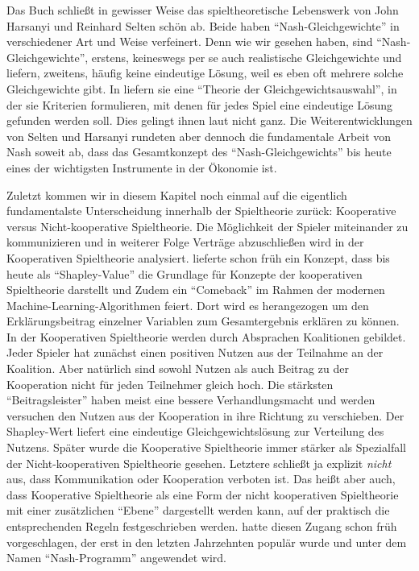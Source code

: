 Das Buch \textcite{Harsanyi1988} schließt in gewisser Weise das spieltheoretische Lebenswerk von John Harsanyi und Reinhard Selten schön ab. Beide haben "`Nash-Gleichgewichte"' in verschiedener Art und Weise verfeinert. Denn wie wir gesehen haben, sind "`Nash-Gleichgewichte"', erstens, keineswegs per se auch realistische Gleichgewichte und liefern, zweitens, häufig keine eindeutige Lösung, weil es eben oft mehrere solche Gleichgewichte gibt. In \textcite{Harsanyi1988} liefern sie eine "`Theorie der Gleichgewichtsauswahl"', in der sie Kriterien formulieren, mit denen für jedes Spiel eine eindeutige Lösung gefunden werden soll. Dies gelingt ihnen laut \textcite[S. 134]{Holler2005} nicht ganz. Die Weiterentwicklungen von Selten und Harsanyi rundeten aber dennoch die fundamentale Arbeit von Nash soweit ab, dass das Gesamtkonzept des "`Nash-Gleichgewichts"' bis heute eines der wichtigsten Instrumente in der Ökonomie ist.

Zuletzt kommen wir in diesem Kapitel noch einmal auf die eigentlich fundamentalste Unterscheidung innerhalb der Spieltheorie zurück: Kooperative versus Nicht-kooperative Spieltheorie. Die Möglichkeit der Spieler miteinander zu kommunizieren und in weiterer Folge Verträge abzuschließen wird in der Kooperativen Spieltheorie analysiert. \textcite{Shapley1953} lieferte schon früh ein Konzept, dass bis heute als "`Shapley-Value"' die Grundlage für Konzepte der kooperativen Spieltheorie darstellt und Zudem ein "`Comeback"' im Rahmen der modernen Machine-Learning-Algorithmen feiert. Dort wird es herangezogen um den Erklärungsbeitrag einzelner Variablen zum Gesamtergebnis erklären zu können. In der Kooperativen Spieltheorie werden durch Absprachen Koalitionen gebildet. Jeder Spieler hat zunächst einen positiven Nutzen aus der Teilnahme an der Koalition. Aber natürlich sind sowohl Nutzen als auch Beitrag zu der Kooperation nicht für jeden Teilnehmer gleich hoch. Die stärksten "`Beitragsleister"' haben meist eine bessere Verhandlungsmacht und werden versuchen den Nutzen aus der Kooperation in ihre Richtung zu verschieben. Der Shapley-Wert liefert eine eindeutige Gleichgewichtslösung zur Verteilung des Nutzens. 
Später wurde die Kooperative Spieltheorie immer stärker als Spezialfall der Nicht-kooperativen Spieltheorie gesehen. Letztere schließt ja explizit \textit{nicht} aus, dass Kommunikation oder Kooperation verboten ist. Das heißt aber auch, dass Kooperative Spieltheorie als eine Form der nicht kooperativen Spieltheorie mit einer zusätzlichen "`Ebene"' dargestellt werden kann, auf der praktisch die entsprechenden Regeln festgeschrieben werden. \textcite{Nash1953} hatte diesen Zugang schon früh vorgeschlagen, der erst in den letzten Jahrzehnten populär wurde und unter dem Namen "`Nash-Programm"' angewendet wird.

